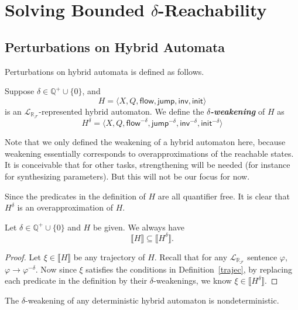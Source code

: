 \documentclass[envcountsect]{llncs}
\newcommand{\flow}{\mathsf{flow}}
\newcommand{\jump}{\mathsf{jump}}
\newcommand{\inv}{\mathsf{inv}}
\newcommand{\init}{\mathsf{init}}
\newcommand{\lrf}{\mathcal{L}_{\mathbb{R}_{\mathcal{F}}}}
\begin{document}
\section{Solving Bounded $\delta$-Reachability}


\subsection{Perturbations on Hybrid Automata}
Perturbations on hybrid automata is defined as follows. 

\begin{definition}
Suppose $\delta\in\mathbb{Q}^+\cup\{0\}$, and 
$$H = \langle X, Q, \flow, \jump, \inv, \init\rangle$$
is an $\lrf$-represented hybrid automaton. We define the {\bf \em $\delta$-weakening} of $H$ as
$$H^{\delta} = \langle X, Q, \flow^{-\delta}, \jump^{-\delta}, \inv^{-\delta}, \init^{-\delta}\rangle$$
\end{definition}

\begin{remark}
Note that we only defined the weakening of a hybrid automaton here, because weakening essentially corresponds to overapproximations of the reachable states. It is conceivable that for other tasks, strengthening will be needed (for instance for synthesizing parameters). But this will not be our focus for now. 
\end{remark}

Since the predicates in the definition of $H$ are all quantifier free. It is clear that $H^{\delta}$ is an overapproximation of $H$. 
\begin{proposition} Let $\delta\in\mathbb{Q}^+\cup \{0\}$ and $H$ be given. We always have
$$\llbracket H\rrbracket\subseteq \llbracket H^{\delta}\rrbracket.$$
\end{proposition}
\begin{proof}
Let $\xi\in \llbracket H\rrbracket$ be any trajectory of $H$. Recall that for any $\lrf$ sentence $\varphi$, $\varphi\rightarrow\varphi^{-\delta}$. Now since $\xi$ satisfies the conditions in Definition~\ref{trajec}, by replacing each predicate in the definition by their $\delta$-weakenings, we know $\xi\in \llbracket H^{\delta}\rrbracket$.
\end{proof}
\begin{remark}
The $\delta$-weakening of any deterministic hybrid automaton is nondeterministic. 
\end{remark}
\end{document}
